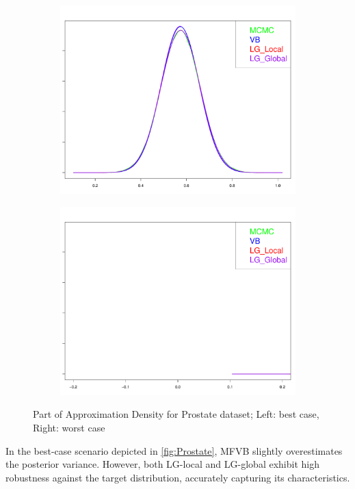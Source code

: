\begin{figure}[h]
	\begin{subfigure}{0.5\textwidth}
		\centering
		\includegraphics[page = 1, width=\linewidth,keepaspectratio]{lasso_densities_prostate.pdf}
	\end{subfigure}
	\begin{subfigure}{0.5\textwidth}
		\includegraphics[page = 7, width=\linewidth,keepaspectratio]{lasso_densities_prostate-1.pdf}
	\end{subfigure}
	\caption{Part of Approximation Density for Prostate dataset; Left: best case, Right: worst case}
	\label{fig:Prostate}
\end{figure}
In the best-case scenario depicted in \autoref{fig:Prostate}, MFVB slightly overestimates the posterior variance. However, both LG-local and LG-global exhibit high robustness against the target distribution, accurately capturing its characteristics.

